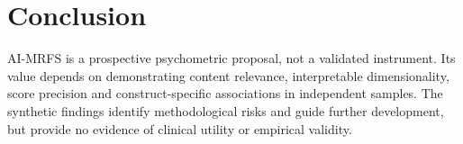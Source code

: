 \documentclass[11pt,a4paper]{article}
\begin{document}
\section{Conclusion}
AI-MRFS is a prospective psychometric proposal, not a validated instrument. Its value depends on demonstrating content relevance, interpretable dimensionality, score precision and construct-specific associations in independent samples. The synthetic findings identify methodological risks and guide further development, but provide no evidence of clinical utility or empirical validity.

\printbibliography
\end{document}
